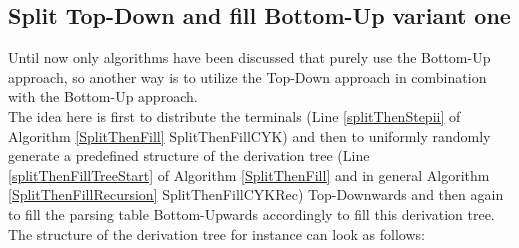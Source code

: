 \pagebreak
\subsection{Split Top-Down and fill Bottom-Up variant one}
Until now only algorithms have been discussed that purely use the Bottom-Up approach, so another way is to utilize the Top-Down approach in combination with the Bottom-Up approach.\\
The idea here is first to distribute the terminals (Line \ref{splitThenStepii} of Algorithm \ref{SplitThenFill} SplitThenFillCYK) and then to uniformly randomly generate a predefined structure of the derivation tree (Line \ref{splitThenFillTreeStart} of Algorithm \ref{SplitThenFill} and in general Algorithm \ref{SplitThenFillRecursion} SplitThenFillCYKRec) Top-Downwards and then again to fill the parsing table Bottom-Upwards accordingly to fill this derivation tree. The structure of the derivation tree for instance can look as follows:\\

